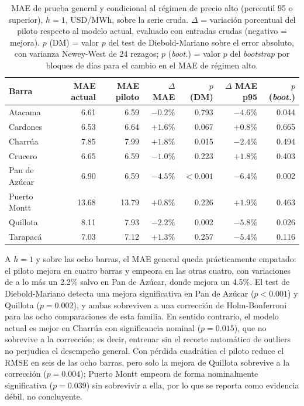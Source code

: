 \begin{table}[htbp]
    \centering
    \begin{tabular}{lrrrrrr}
        \toprule
        Barra & MAE actual & MAE piloto & $\Delta$ MAE & $p$ (DM) & $\Delta$ MAE p95 & $p$ (\textit{boot.}) \\
        \midrule
        Atacama       & 6.61  & 6.59  & $-0.2\%$ & 0.793    & $-4.6\%$ & 0.044 \\
        Cardones      & 6.53  & 6.64  & $+1.6\%$ & 0.067    & $+0.8\%$ & 0.665 \\
        Charrúa       & 7.85  & 7.99  & $+1.8\%$ & 0.015    & $-2.4\%$ & 0.494 \\
        Crucero       & 6.65  & 6.59  & $-1.0\%$ & 0.223    & $+1.8\%$ & 0.403 \\
        Pan de Azúcar & 6.90  & 6.59  & $-4.5\%$ & $<0.001$ & $-6.4\%$ & 0.002 \\
        Puerto Montt  & 13.68 & 13.79 & $+0.8\%$ & 0.226    & $+1.9\%$ & 0.463 \\
        Quillota      & 8.11  & 7.93  & $-2.2\%$ & 0.002    & $-5.8\%$ & 0.026 \\
        Tarapacá      & 7.03  & 7.12  & $+1.3\%$ & 0.257    & $-5.4\%$ & 0.116 \\
        \bottomrule
    \end{tabular}
    \vspace{0.2cm}
    \caption{MAE de prueba general y condicional al régimen de precio alto (percentil 95 o superior), $h=1$, USD/MWh, sobre la serie cruda. $\Delta$ = variación porcentual del piloto respecto al modelo actual, evaluado con entradas crudas (negativo = mejora). $p$ (DM) = valor $p$ del test de Diebold-Mariano sobre el error absoluto, con varianza Newey-West de 24 rezagos; $p$ (\textit{boot.}) = valor $p$ del \textit{bootstrap} por bloques de días para el cambio en el MAE de régimen alto.}
    \label{tab:piloto_outliers_h1}
\end{table}

A $h=1$ y sobre las ocho barras, el MAE general queda prácticamente empatado: el piloto mejora en cuatro barras y empeora en las otras cuatro, con variaciones de a lo más un 2.2\% salvo en Pan de Azúcar, donde mejora un 4.5\%. El test de Diebold-Mariano detecta una mejora significativa en Pan de Azúcar ($p<0.001$) y Quillota ($p=0.002$), y ambas sobreviven a una corrección de Holm-Bonferroni para las ocho comparaciones de esta familia. En sentido contrario, el modelo actual es mejor en Charrúa con significancia nominal ($p=0.015$), que no sobrevive a la corrección; es decir, entrenar sin el recorte automático de outliers no perjudica el desempeño general. Con pérdida cuadrática el piloto reduce el RMSE en seis de las ocho barras, pero solo la mejora de Quillota sobrevive a la corrección ($p=0.004$); Puerto Montt empeora de forma nominalmente significativa ($p=0.039$) sin sobrevivir a ella, por lo que se reporta como evidencia débil, no concluyente.

